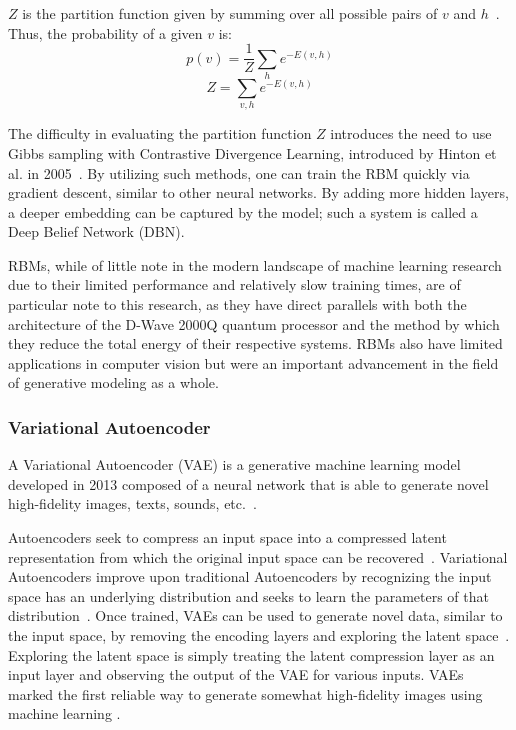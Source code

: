 \documentclass[technologies,article,accept,pdftex,moreauthors]{Definitions/mdpi}
\begin{document}
$Z$ is the partition function given by summing over all possible pairs of $v$ and $h$~\cite{Hinton2012}. Thus, the probability of a given $v$ is: 
\begin{equation}
p(v) = \frac{1}{Z}\sum_{h} e^{-E(v,h)}
\end{equation} 
\begin{equation}
Z = \sum_{v,h}e^{-E(v,h)}
\end{equation}



The difficulty in evaluating the partition function $Z$ introduces the need to use Gibbs sampling with Contrastive Divergence Learning, introduced by Hinton et al. in 2005~\cite{CarreiraPerpin2005OnCD}. By utilizing such methods, one can train the RBM quickly via gradient descent, similar to other neural networks. By adding more hidden layers, a deeper embedding can be captured by the model; such a system is called a Deep Belief Network (DBN).


RBMs, while of little note in the modern landscape of machine learning research due to their limited performance and relatively slow training times, are of particular note to this research, as they have direct parallels with both the architecture of the D-Wave 2000Q quantum processor and the method by which they reduce the total energy of their respective systems. RBMs also have limited applications in computer vision but were an important advancement in the field of generative modeling as a whole.



\subsubsection{Variational Autoencoder}
A Variational Autoencoder (VAE) is a generative machine learning model developed in 2013 composed of a neural network that is able to generate novel high-fidelity images, texts, sounds, etc.~\cite{kingma2014autoencoding}.


Autoencoders seek to compress an input space into a compressed latent representation from which the original input space can be recovered~\cite{kingma2014autoencoding}. Variational Autoencoders improve upon traditional Autoencoders by recognizing the input space has an underlying distribution and seeks to learn the parameters of that distribution~\cite{kingma2014autoencoding}. Once trained, VAEs can be used to generate novel data, similar to the input space, by removing the encoding layers and exploring the latent space~\cite{kingma2014autoencoding}. Exploring the latent space is simply treating the latent compression layer as an input layer and observing the output of the VAE for various inputs. VAEs marked the first reliable way to generate somewhat high-fidelity images using machine learning \cite{rocca_2021}.
\end{document}
